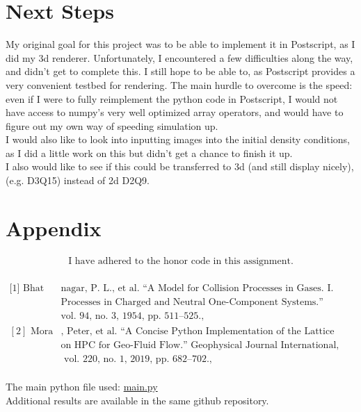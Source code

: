 \documentclass[12pt]{article}
\begin{document}
	\section{Next Steps}
	My original goal for this project was to be able to implement it in Postscript, as I did my 3d renderer. Unfortunately,  I encountered a few difficulties along the way, and didn't get to complete this. I still hope to be able to, as Postscript provides a very convenient testbed for rendering. The main hurdle to overcome is the speed: even if I were to fully reimplement the python code in Postscript, I would not have access to numpy's very well optimized array operators, and would have to figure out  my own way of speeding simulation up.\\I would also like to look into inputting images into the initial density conditions, as I did a little work on this but didn't get a chance to finish it up.\\I also would like to see if this could be transferred to 3d (and still display nicely), (e.g. D3Q15) instead of 2d D2Q9.
	\section{Appendix}
	\begin{align*}
		\text{I have adhered to the honor code in this assignment.}
	\end{align*}\\
	$\begin{aligned}
		\text{{[1]} Bhat}&\text{nagar, P. L., et al. “A Model for Collision Processes in Gases. I. Small Amplitude}\\&\text{Processes in Charged and Neutral One-Component Systems.” Physical Review,}\\& \text{vol. 94, no. 3, 1954, pp. 511–525., https://doi.org/10.1103/physrev.94.511.} \\
		{[2]}\text{ Mora}&\text{, Peter, et al. “A Concise Python Implementation of the Lattice Boltzmann Method}\\&\text{on HPC for Geo-Fluid Flow.” Geophysical Journal International,}\\&\text{ vol. 220, no. 1, 2019, pp. 682–702., https://doi.org/10.1093/gji/ggz423. }
	\end{aligned}$\\\\
	The main python file used: \href{https://github.com/bn0367/MATH397/blob/main/final/main.py}{main.py}\\
	Additional results are available in the same github repository.
	

	
\end{document}
